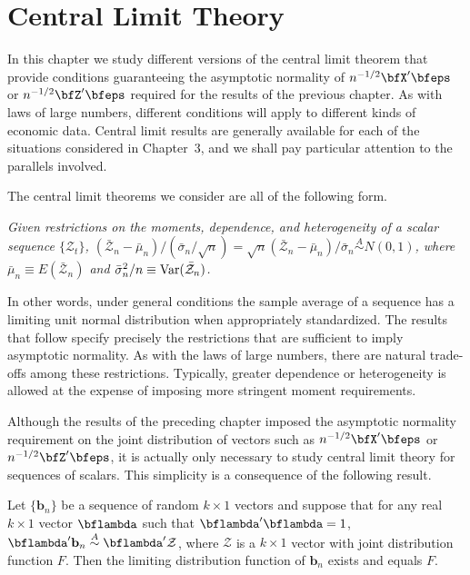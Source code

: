 \chapter{Central Limit Theory}\label{ch:clt}

In this chapter we study different versions of the central limit theorem that provide conditions guaranteeing the asymptotic normality of $n^{-1/2}\bfX'\bfeps$ or $n^{-1/2}\bfZ'\bfeps$ required for the results of the previous chapter. As with laws of large numbers, different conditions will apply to different kinds of economic data. Central limit results are generally available for each of the situations considered in Chapter~3, and we shall pay particular attention to the parallels involved.

The central limit theorems we consider are all of the following form.

\begin{proposition}\label{prop:clt-form}
\textit{Given restrictions on the moments, dependence, and heterogeneity of a scalar sequence $\{\mathcal{Z}_t\}$, $(\bar{\mathcal{Z}}_n - \bar{\mu}_n)/(\bar{\sigma}_n/\sqrt{n}) = \sqrt{n}(\bar{\mathcal{Z}}_n - \bar{\mu}_n)/\bar{\sigma}_n \overset{A}{\sim} N(0,1)$, where $\bar{\mu}_n \equiv E(\bar{\mathcal{Z}}_n)$ and $\bar{\sigma}_n^2/n \equiv \operatorname{Var}(\bar{\mathcal{Z}}_n)$.}
\end{proposition}

In other words, under general conditions the sample average of a sequence has a limiting unit normal distribution when appropriately standardized. The results that follow specify precisely the restrictions that are sufficient to imply asymptotic normality. As with the laws of large numbers, there are natural trade-offs among these restrictions. Typically, greater dependence or heterogeneity is allowed at the expense of imposing more stringent moment requirements.

Although the results of the preceding chapter imposed the asymptotic normality requirement on the joint distribution of vectors such as $n^{-1/2}\bfX'\bfeps$ or $n^{-1/2}\bfZ'\bfeps$, it is actually only necessary to study central limit theory for sequences of scalars. This simplicity is a consequence of the following result.

\begin{proposition}\label{prop:cramer-wold}
Let $\{\mathbf{b}_n\}$ be a sequence of random $k \times 1$ vectors and suppose that for any real $k \times 1$ vector $\bflambda$ such that $\bflambda'\bflambda = 1$, $\bflambda'\mathbf{b}_n \overset{A}{\sim} \bflambda'\mathcal{Z}$, where $\mathcal{Z}$ is a $k \times 1$ vector with joint distribution function $F$. Then the limiting distribution function of $\mathbf{b}_n$ exists and equals $F$.
\end{proposition}


